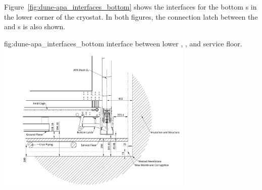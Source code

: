 Figure~\ref{fig:dune-apa_interfaces_bottom} shows the interfaces for
the bottom s in the lower corner of the cryostat. In both figures,
the connection latch between the  and s is also
shown.
\begin{dunefigure}{fig:dune-apa_interfaces_bottom}
  { interface between lower , , and
    service floor.}
  \includegraphics[width=0.7\textwidth]{graphics/Interface_lower_apa.pdf}
\end{dunefigure}

